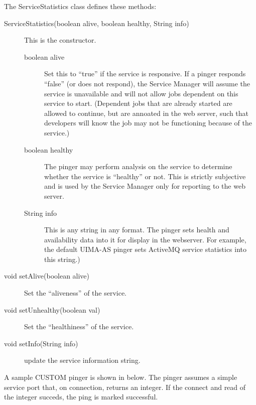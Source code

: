       The ServiceStatistics class defines these methods:
      \begin{description}
        \item[ServiceStatistics(boolean alive, boolean healthy, String info)] This is the constructor.
          \begin{description}
            \item[boolean alive] Set this to ``true'' if the service is responsive.  If a pinger responds
              ``false'' (or does not respond), the Service Manager will assume the service is unavailable
              and will not allow jobs dependent on this service to start.  (Dependent jobs that are already
              started are allowed to continue, but are annoated in the web server, such that developers
              will know the job may not be functioning because of the service.)
            \item[boolean healthy] The pinger may perform analysis on the service to determine whether
              the service is ``healthy'' or not.  This is strictly subjective and is used by the
              Service Manager only for reporting to the web server.
            \item[String info] This is any string in any format.  The pinger sets health and availability
              data into it for display in the webserver.  For example, the default UIMA-AS pinger sets
              ActiveMQ service statistics into this string.)
          \end{description}
          
          \item[void setAlive(boolean alive)] Set the ``aliveness'' of the service.

          \item[void setUnhealthy(boolean val)] Set the ``healthiness'' of the service.
            
          \item[void setInfo(String info)] update the service information string.
      \end{description}

      A sample CUSTOM pinger is shown in  below. The pinger assumes a simple
      service port that, on connection, returns an integer.  If the connect and read of the integer succeds,
      the ping is marked successful. 

